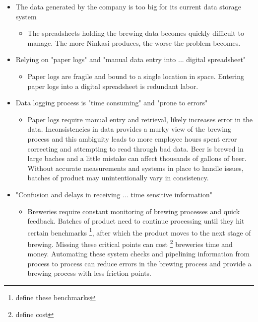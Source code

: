 \documentclass[draftclsnofoot,onecolumn,letterpaper,10pt]{IEEEtran}
\begin{document}
\begin{itemize}

    \item {The data generated by the company is too big for its current data storage system}
      \begin{itemize}
      \item {The spreadsheets holding the brewing data becomes quickly difficult to manage. The more Ninkasi produces, the worse the problem becomes.}
      \end{itemize}

		\item {Relying on "paper logs" and "manual data entry into ... digital spreadsheet"}
	    \begin{itemize}
			\item {Paper logs are fragile and bound to a single location in space. Entering paper logs into a digital spreadsheet is redundant labor.}
      \end{itemize}

		\item {Data logging process is "time consuming" and "prone to errors"}
      \begin{itemize}
			\item {Paper logs require manual entry and retrieval, likely increases error in the data. Inconsistencies in data provides a murky view of the brewing process and this ambiguity leads to more employee hours spent error correcting and attempting to read through bad data. Beer is brewed in large baches and a little mistake can affect thousands of gallons of beer. Without accurate measurements and systems in place to handle issues, batches of product may unintentionally vary in consistency.}
      \end{itemize}

		\item {"Confusion and delays in receiving ... time sensitive information"}
      \begin{itemize}
			\item {Breweries require constant monitoring of brewing processes and quick feedback. Batches of product need to continue processing until they hit certain benchmarks \footnote{define these benchmarks}, after which the product moves to the next stage of brewing. Missing these critical points can cost \footnote{define cost} breweries time and money. Automating these system checks and pipelining information from process to process can reduce errors in the brewing process and provide a brewing process with less friction points.
}
      \end{itemize}


\end{itemize}
\end{document}
